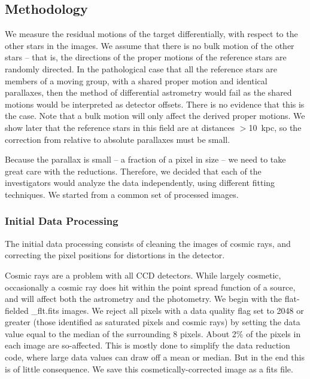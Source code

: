 \documentclass[12pt,preprint]{aastex}
\begin{document}
\subsection{Methodology}

We measure the residual motions of the target differentially, with respect to
the other stars in the images. We assume that there is no bulk motion of the
other stars -- that
is, the directions of the proper motions of the reference stars are 
randomly directed. In the pathological case that all the reference stars
are members of a moving group, with a shared proper motion and identical
parallaxes, then the method of differential astrometry would fail as the shared
motions would be interpreted as detector offsets.
There is no evidence that this is the case. 
Note that a bulk motion will
only affect the derived proper motions. We show later that the reference stars
in this field are at distances $>$10~kpc, so the correction from relative to
absolute parallaxes must be small. 

Because the parallax is small -- a fraction of a pixel in size -- we need to
take great care with the reductions. Therefore, we decided
that each of the investigators would analyze the data independently, using
different fitting techniques. We started from a common
set of processed images.

\subsubsection{Initial Data Processing}

The initial data processing consists of cleaning the images of cosmic rays,
and correcting the pixel positions for distortions in the detector.

Cosmic rays are a problem with all CCD detectors. While largely
cosmetic, occasionally a cosmic ray does hit within the point spread function
of a source, and will affect both the astrometry and the photometry.
We begin with the flat-fielded \_flt.fits images.
We reject all pixels with a data quality flag set to 2048 or greater
(those identified as saturated pixels and cosmic rays)
by setting the data value equal to the 
median of the surrounding 8 pixels.
About 2\% of the pixels in each image are so-affected.
This is mostly done to simplify the data
reduction code, where large data values can draw off a mean or median. But in
the end this is of little consequence.
We save this cosmetically-corrected image as a fits file.
\end{document}
